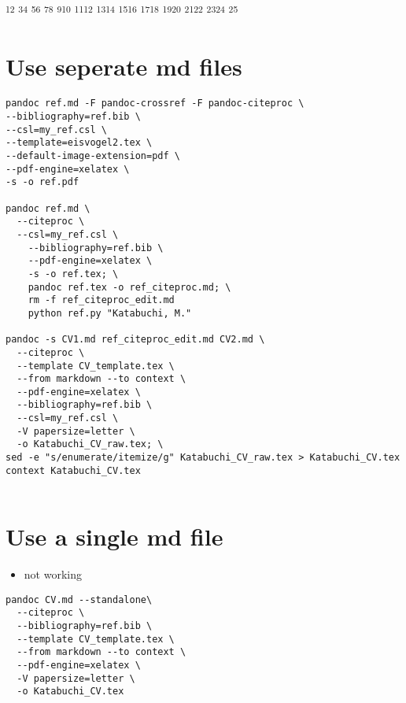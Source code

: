 \documentclass[
]{article}
\author{}
\date{}
\providecommand{\tightlist}{%
  \setlength{\itemsep}{0pt}\setlength{\parskip}{0pt}}
\begin{document}
\textsuperscript{1}\textsuperscript{2}
\textsuperscript{3}\textsuperscript{4}
\textsuperscript{5}\textsuperscript{6}
\textsuperscript{7}\textsuperscript{8}
\textsuperscript{9}\textsuperscript{10}
\textsuperscript{11}\textsuperscript{12}
\textsuperscript{13}\textsuperscript{14}
\textsuperscript{15}\textsuperscript{16}
\textsuperscript{17}\textsuperscript{18}
\textsuperscript{19}\textsuperscript{20}
\textsuperscript{21}\textsuperscript{22}
\textsuperscript{23}\textsuperscript{24} \textsuperscript{25}

\hypertarget{use-seperate-md-files}{%
\section{Use seperate md files}\label{use-seperate-md-files}}

\begin{verbatim}
pandoc ref.md -F pandoc-crossref -F pandoc-citeproc \
--bibliography=ref.bib \
--csl=my_ref.csl \
--template=eisvogel2.tex \
--default-image-extension=pdf \
--pdf-engine=xelatex \
-s -o ref.pdf

pandoc ref.md \
  --citeproc \
  --csl=my_ref.csl \
    --bibliography=ref.bib \
    --pdf-engine=xelatex \
    -s -o ref.tex; \
    pandoc ref.tex -o ref_citeproc.md; \
    rm -f ref_citeproc_edit.md
    python ref.py "Katabuchi, M."

pandoc -s CV1.md ref_citeproc_edit.md CV2.md \
  --citeproc \
  --template CV_template.tex \
  --from markdown --to context \
  --pdf-engine=xelatex \
  --bibliography=ref.bib \
  --csl=my_ref.csl \
  -V papersize=letter \
  -o Katabuchi_CV_raw.tex; \
sed -e "s/enumerate/itemize/g" Katabuchi_CV_raw.tex > Katabuchi_CV.tex 
context Katabuchi_CV.tex
  
\end{verbatim}

\hypertarget{use-a-single-md-file}{%
\section{Use a single md file}\label{use-a-single-md-file}}

\begin{itemize}
\tightlist
\item
  not working
\end{itemize}

\begin{verbatim}
pandoc CV.md --standalone\
  --citeproc \
  --bibliography=ref.bib \
  --template CV_template.tex \
  --from markdown --to context \
  --pdf-engine=xelatex \
  -V papersize=letter \
  -o Katabuchi_CV.tex
\end{verbatim}
\end{document}
